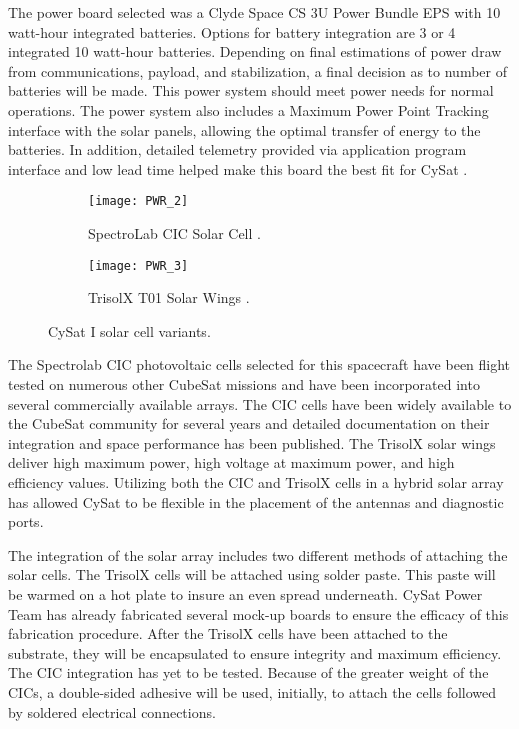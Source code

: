 \documentclass[nocover]            %
{CSLI}                       %
\begin{document}
The power board selected was a Clyde Space CS 3U Power Bundle EPS with 10 watt-hour integrated batteries. Options for battery integration are 3 or 4 integrated 10 watt-hour batteries. Depending on final estimations of power draw from communications, payload, and stabilization, a final decision as to number of batteries will be made. This power system should meet power needs for normal operations. The power system also includes a Maximum Power Point Tracking interface with the solar panels, allowing the optimal transfer of energy to the batteries. In addition, detailed telemetry provided via application program interface and low lead time helped make this board the best fit for CySat \cite{Clyde Space}.

\begin{figure}[H]
\centering
\begin{subfigure}[b]{0.4\textwidth}
\texttt{[image: PWR\_2]}
\caption{SpectroLab CIC Solar Cell \cite{Spectrolab}.}
\end{subfigure}
\hfill
\begin{subfigure}[b]{0.4\textwidth}
\texttt{[image: PWR\_3]}
\caption{TrisolX T01 Solar Wings \cite{TrisolX}.}
\end{subfigure}
\caption{CySat I solar cell variants.}
\end{figure}





The Spectrolab CIC photovoltaic cells selected for this spacecraft have been flight tested on numerous other CubeSat missions and have been incorporated into several commercially available arrays. The CIC cells have been widely available to the CubeSat community for several years and detailed documentation on their integration and space performance has been published. The TrisolX solar wings deliver high maximum power, high voltage at maximum power, and high efficiency values. Utilizing both the CIC and TrisolX cells in a hybrid solar array has allowed CySat to be flexible in the placement of the antennas and diagnostic ports.



The integration of the solar array includes two different methods of attaching the solar cells. The TrisolX cells will be attached using solder paste. This paste will be warmed on a hot plate to insure an even spread underneath. CySat Power Team has already fabricated several mock-up boards to ensure the efficacy of this fabrication procedure. After the TrisolX cells have been attached to the substrate, they will be encapsulated to ensure integrity and maximum efficiency. The CIC integration has yet to be tested. Because of the greater weight of the CICs, a double-sided adhesive will be used, initially, to attach the cells followed by soldered electrical connections.
\end{document}
